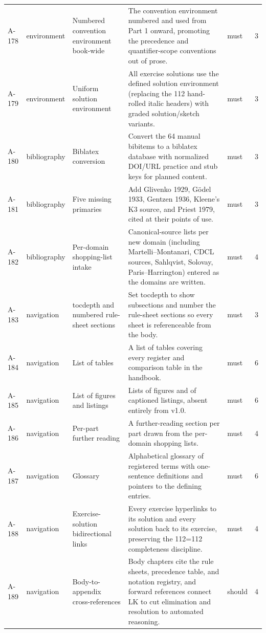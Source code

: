 \begin{longtable}{@{}p{0.45in}p{0.78in}p{2.02in}p{2.6in}p{0.42in}p{0.16in}@{}}
A-178 & environment & Numbered convention environment book-wide & The convention environment numbered and used from Part 1 onward, promoting the precedence and quantifier-scope conventions out of prose. & must & 3 \\
A-179 & environment & Uniform solution environment & All exercise solutions use the defined solution environment (replacing the 112 hand-rolled italic headers) with graded solution/sketch variants. & must & 3 \\
A-180 & bibliography & Biblatex conversion & Convert the 64 manual bibitems to a biblatex database with normalized DOI/URL practice and stub keys for planned content. & must & 3 \\
A-181 & bibliography & Five missing primaries & Add Glivenko 1929, G\"odel 1933, Gentzen 1936, Kleene's K3 source, and Priest 1979, cited at their points of use. & must & 3 \\
A-182 & bibliography & Per-domain shopping-list intake & Canonical-source lists per new domain (including Martelli--Montanari, CDCL sources, Sahlqvist, Solovay, Paris--Harrington) entered as the domains are written. & must & 4 \\
A-183 & navigation & tocdepth and numbered rule-sheet sections & Set tocdepth to show subsections and number the rule-sheet sections so every sheet is referenceable from the body. & must & 3 \\
A-184 & navigation & List of tables & A list of tables covering every register and comparison table in the handbook. & must & 6 \\
A-185 & navigation & List of figures and listings & Lists of figures and of captioned listings, absent entirely from v1.0. & must & 6 \\
A-186 & navigation & Per-part further reading & A further-reading section per part drawn from the per-domain shopping lists. & must & 4 \\
A-187 & navigation & Glossary & Alphabetical glossary of registered terms with one-sentence definitions and pointers to the defining entries. & must & 6 \\
A-188 & navigation & Exercise-solution bidirectional links & Every exercise hyperlinks to its solution and every solution back to its exercise, preserving the 112=112 completeness discipline. & must & 4 \\
A-189 & navigation & Body-to-appendix cross-references & Body chapters cite the rule sheets, precedence table, and notation registry, and forward references connect LK to cut elimination and resolution to automated reasoning. & should & 4 \\

\end{longtable}
